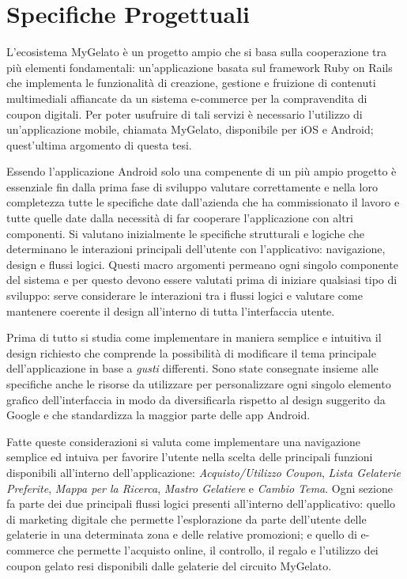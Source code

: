 \section{Specifiche Progettuali}

L'ecosistema MyGelato è un progetto ampio che si basa sulla cooperazione tra più elementi fondamentali: un’applicazione basata sul framework Ruby on Rails che implementa le funzionalità di creazione, gestione e fruizione di contenuti multimediali affiancate da un sistema e-commerce per la compravendita di coupon digitali.
Per poter usufruire di tali servizi è necessario l'utilizzo di un'applicazione mobile, chiamata MyGelato, disponibile per iOS e Android; quest'ultima argomento di questa tesi.

Essendo l'applicazione Android solo una compenente di un più ampio progetto è essenziale fin dalla prima fase di sviluppo valutare correttamente e nella loro completezza tutte le specifiche date dall'azienda che ha commissionato il lavoro e tutte quelle date dalla necessità di far cooperare l'applicazione con altri componenti.
Si valutano inizialmente le specifiche strutturali e logiche che determinano le interazioni principali dell'utente con l'applicativo: navigazione, design e flussi logici.
Questi macro argomenti permeano ogni singolo componente del sistema e per questo devono essere valutati prima di iniziare qualsiasi tipo di sviluppo: serve considerare le interazioni tra i flussi logici e valutare come mantenere coerente il design all'interno di tutta l'interfaccia utente.

Prima di tutto si studia come implementare in maniera semplice e intuitiva il design richiesto che comprende la possibilità di modificare il tema principale dell'applicazione in base a \textit{gusti} differenti.
Sono state consegnate insieme alle specifiche anche le risorse da utilizzare per personalizzare ogni singolo elemento grafico dell'interfaccia in modo da diversificarla rispetto al design suggerito da Google e che standardizza la maggior parte delle app Android.

Fatte queste considerazioni si valuta come implementare una navigazione semplice ed intuiva per favorire l'utente nella scelta delle principali funzioni disponibili all'interno dell'applicazione: \textit{Acquisto/Utilizzo Coupon}, \textit{Lista Gelaterie Preferite}, \textit{Mappa per la Ricerca}, \textit{Mastro Gelatiere} e \textit{Cambio Tema}.
Ogni sezione fa parte dei due principali flussi logici presenti all'interno dell'applicativo: quello di marketing digitale che permette l'esplorazione da parte dell'utente delle gelaterie in una determinata zona e delle relative promozioni; e quello di e-commerce che permette l'acquisto online, il controllo, il regalo e l'utilizzo dei coupon gelato resi disponibili dalle gelaterie del circuito MyGelato.

